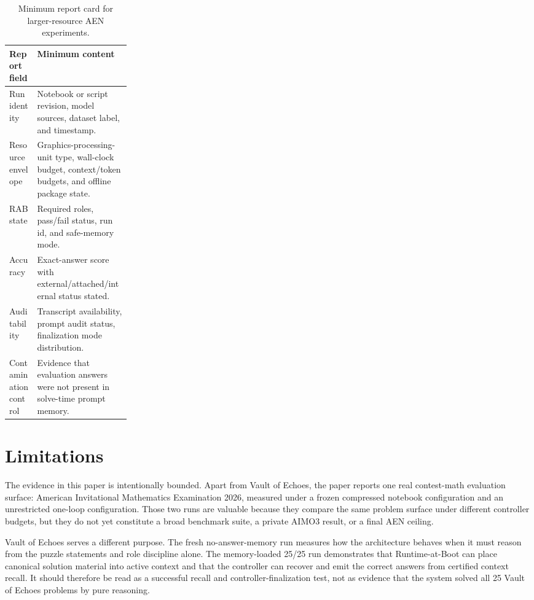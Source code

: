 \documentclass[11pt]{article}
\newcommand{\rab}{RAB}
\begin{document}
\begin{table}[t]
\centering
\small
\begin{tabularx}{\linewidth}{p{0.23\linewidth}X}
\toprule
Report field & Minimum content \\
\midrule
Run identity & Notebook or script revision, model sources, dataset label, and timestamp. \\
Resource envelope & Graphics-processing-unit type, wall-clock budget, context/token budgets, and offline package state. \\
\rab{} state & Required roles, pass/fail status, run id, and safe-memory mode. \\
Accuracy & Exact-answer score with external/attached/internal status stated. \\
Auditability & Transcript availability, prompt audit status, finalization mode distribution. \\
Contamination control & Evidence that evaluation answers were not present in solve-time prompt memory. \\
\bottomrule
\end{tabularx}
\caption{Minimum report card for larger-resource AEN experiments.}
\label{tab:report-card}
\end{table}

\section{Limitations}

The evidence in this paper is intentionally bounded. Apart from Vault of Echoes, the paper reports one real contest-math evaluation surface: American Invitational Mathematics Examination 2026, measured under a frozen compressed notebook configuration and an unrestricted one-loop configuration. Those two runs are valuable because they compare the same problem surface under different controller budgets, but they do not yet constitute a broad benchmark suite, a private AIMO3 result, or a final AEN ceiling.

Vault of Echoes serves a different purpose. The fresh no-answer-memory run measures how the architecture behaves when it must reason from the puzzle statements and role discipline alone. The memory-loaded 25/25 run demonstrates that Runtime-at-Boot can place canonical solution material into active context and that the controller can recover and emit the correct answers from certified context recall. It should therefore be read as a successful recall and controller-finalization test, not as evidence that the system solved all 25 Vault of Echoes problems by pure reasoning.
\end{document}
